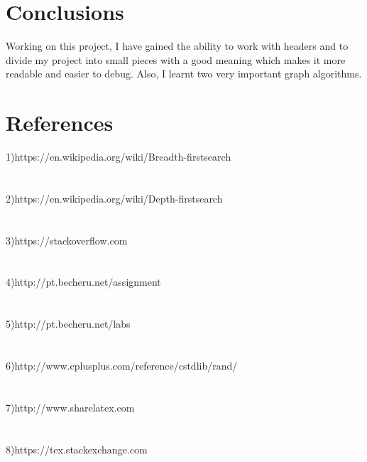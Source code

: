 \documentclass[14pt]{article}
\begin{document}
\newpage
\section*{Conclusions}
\vspace{10 mm}
\hspace*{1cm} Working on this project, I have gained the ability to work with headers and to divide my project into small pieces with a good meaning which makes it more readable and easier to debug. Also, I learnt two very important graph algorithms.

\newpage
\section*{References}
\large 
1)https://en.wikipedia.org/wiki/Breadth-first\textunderscore search
\\
\\\vspace{2mm}
\\
2)https://en.wikipedia.org/wiki/Depth-first\textunderscore search
\\
\\\vspace{2mm}
\\
3)https://stackoverflow.com
\\
\\\vspace{2mm}
\\
4)http://pt.becheru.net/assignment
\\
\\\vspace{2mm}
\\
5)http://pt.becheru.net/labs
\\
\\\vspace{2mm}
\\
6)http://www.cplusplus.com/reference/cstdlib/rand/
\\
\\\vspace{2mm}
\\
7)http://www.sharelatex.com
\\
\\\vspace{2mm}
\\
8)https://tex.stackexchange.com
\end{document}
